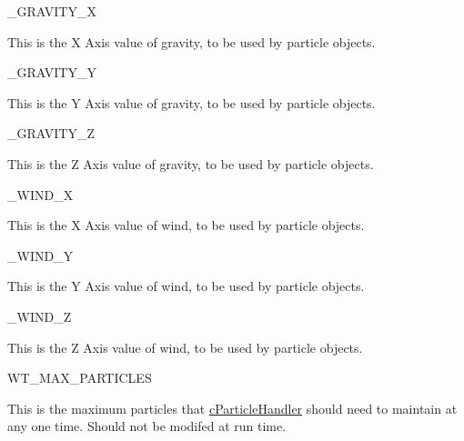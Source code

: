 \begin{DoxyItemize}
\item \_\-GRAVITY\_\-X
\begin{DoxyItemize}
\item This is the X Axis value of gravity, to be used by particle objects.
\end{DoxyItemize}
\end{DoxyItemize}
\begin{DoxyItemize}
\item \_\-GRAVITY\_\-Y
\begin{DoxyItemize}
\item This is the Y Axis value of gravity, to be used by particle objects.
\end{DoxyItemize}
\end{DoxyItemize}
\begin{DoxyItemize}
\item \_\-GRAVITY\_\-Z
\begin{DoxyItemize}
\item This is the Z Axis value of gravity, to be used by particle objects.
\end{DoxyItemize}
\end{DoxyItemize}
\begin{DoxyItemize}
\item \_\-WIND\_\-X
\begin{DoxyItemize}
\item This is the X Axis value of wind, to be used by particle objects.
\end{DoxyItemize}
\end{DoxyItemize}
\begin{DoxyItemize}
\item \_\-WIND\_\-Y
\begin{DoxyItemize}
\item This is the Y Axis value of wind, to be used by particle objects.
\end{DoxyItemize}
\end{DoxyItemize}
\begin{DoxyItemize}
\item \_\-WIND\_\-Z
\begin{DoxyItemize}
\item This is the Z Axis value of wind, to be used by particle objects.
\end{DoxyItemize}
\end{DoxyItemize}
\begin{DoxyItemize}
\item WT\_\-MAX\_\-PARTICLES
\begin{DoxyItemize}
\item This is the maximum particles that \hyperlink{classc_particle_handler}{cParticleHandler} should need to maintain at any one time. Should not be modifed at run time.
\end{DoxyItemize}
\end{DoxyItemize}
